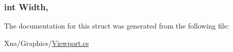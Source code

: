 \subsubsection[{Width}]{\setlength{\rightskip}{0pt plus 5cm}int Width\hspace{0.3cm}{\ttfamily [get]}, {\ttfamily [set]}}\label{structMicrosoft_1_1Xna_1_1Framework_1_1Graphics_1_1Viewport_abbe7749c3b402f7dfe64f936774cfcd4}


The documentation for this struct was generated from the following file\+:\begin{DoxyCompactItemize}
\item 
Xna/\+Graphics/\hyperlink{Viewport_8cs}{Viewport.\+cs}\end{DoxyCompactItemize}
